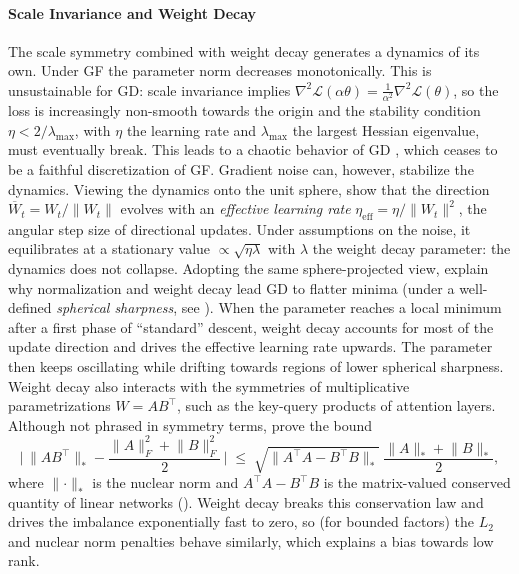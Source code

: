 \documentclass[mathematics,review,submit,moreauthors]{Definitions/mdpi}
\begin{document}
\paragraph{Scale Invariance and Weight Decay}
The scale symmetry combined with weight decay generates a dynamics of its own.
Under GF the parameter norm decreases monotonically.
This is unsustainable for GD: scale invariance implies $\nabla^2 \mathcal{L}(\alpha\theta)=\frac{1}{\alpha^2}\nabla^2 \mathcal{L}(\theta)$, so the loss is increasingly non-smooth towards the origin and the stability condition $\eta<2/\lambda_{\mathrm{max}}$, with $\eta$ the learning rate and $\lambda_{\mathrm{max}}$ the largest Hessian eigenvalue, must eventually break.
This leads to a chaotic behavior of GD \citep{li2020anips}, which ceases to be a faithful discretization of GF.
Gradient noise can, however, stabilize the dynamics.
Viewing the dynamics onto the unit sphere, \citet{li2020anips} show that the direction $\overline{W}_t=W_t/\lVert W_t\rVert$ evolves with an \emph{effective learning rate} $\eta_{\mathrm{eff}}=\eta/\lVert W_t\rVert^2$, the angular step size of directional updates.
Under assumptions on the noise, it equilibrates at a stationary value $\propto\sqrt{\eta\lambda}$ with $\lambda$ the weight decay parameter: the dynamics does not collapse.
Adopting the same sphere-projected view, \citet{lyu2023} explain why normalization and weight decay lead GD to flatter minima (under a well-defined \emph{spherical sharpness}, see ).
When the parameter reaches a local minimum after a first phase of ``standard'' descent, weight decay accounts for most of the update direction and drives the effective learning rate upwards.
The parameter then keeps oscillating while drifting towards regions of lower spherical sharpness.
Weight decay also interacts with the symmetries of multiplicative parametrizations $W=AB^{\top}$, such as the key-query products of attention layers.
Although not phrased in symmetry terms, \citet{kobayashi2024anips} prove the bound
\begin{equation*}
    \Big|\, \lVert AB^{\top}\rVert_{*}-\frac{\lVert A\rVert_F^2+\lVert B\rVert_F^2}{2} \,\Big| \;\le\; \sqrt{\lVert A^{\top}A-B^{\top}B\rVert_{*}}\ \frac{\lVert A\rVert_{*}+\lVert B\rVert_{*}}{2},
\end{equation*}
where $\lVert\cdot\rVert_{*}$ is the nuclear norm and $A^{\top}A-B^{\top}B$ is the matrix-valued conserved quantity of linear networks ().
Weight decay breaks this conservation law and drives the imbalance exponentially fast to zero, so (for bounded factors) the $L_2$ and nuclear norm penalties behave similarly, which explains a bias towards low rank.
\end{document}
